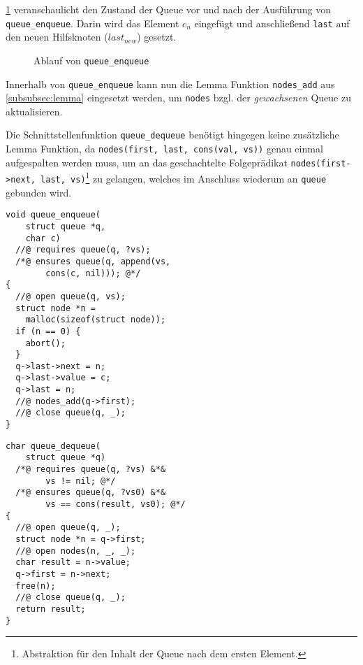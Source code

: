 \cref{fig:list} veranschaulicht den Zustand der Queue vor und nach der Ausführung von \texttt{queue\_enqueue}. Darin wird das Element $c_{n}$ eingefügt und anschließend \texttt{last} auf den neuen Hilfsknoten ($last_{new}$) gesetzt.

\begin{figure}[!hbt]
	\centering
	
	\caption{Ablauf von \texttt{queue\_enqueue}}
	\label{fig:list}
\end{figure}

\noindent
Innerhalb von \texttt{queue\_enqueue} kann nun die Lemma Funktion \texttt{nodes\_add} aus \cref{subsubsec:lemma} eingesetzt werden, um \texttt{nodes} bzgl. der \emph{gewachsenen} Queue zu aktualisieren.

Die Schnittstellenfunktion \texttt{queue\_dequeue} benötigt hingegen keine zusätzliche Lemma Funktion, da \texttt{nodes(first, last, cons(val, vs))} genau einmal aufgespalten werden muss, um an das geschachtelte Folgeprädikat \texttt{nodes(first->next, last, vs)}\footnote{Abstraktion für den Inhalt der Queue nach dem ersten Element.} zu gelangen, welches im Anschluss wiederum an \texttt{queue} gebunden wird.

\vspace{-10pt}
{\noindent
\begin{minipage}[t]{.45\textwidth}
\begin{lstlisting}
void queue_enqueue(
    struct queue *q,
    char c)
  //@ requires queue(q, ?vs);
  /*@ ensures queue(q, append(vs,
        cons(c, nil))); @*/
{
  //@ open queue(q, vs);
  struct node *n =
    malloc(sizeof(struct node));
  if (n == 0) {
    abort();
  }
  q->last->next = n;
  q->last->value = c;
  q->last = n;
  //@ nodes_add(q->first);
  //@ close queue(q, _);
}
\end{lstlisting}
\end{minipage}
\hfill
\begin{minipage}[t]{.45\textwidth}
\begin{lstlisting}
char queue_dequeue(
    struct queue *q)
  /*@ requires queue(q, ?vs) &*&
        vs != nil; @*/
  /*@ ensures queue(q, ?vs0) &*&
        vs == cons(result, vs0); @*/
{
  //@ open queue(q, _);
  struct node *n = q->first;
  //@ open nodes(n, _, _);
  char result = n->value;
  q->first = n->next;
  free(n);
  //@ close queue(q, _);
  return result;
}
\end{lstlisting}
\end{minipage}
}


